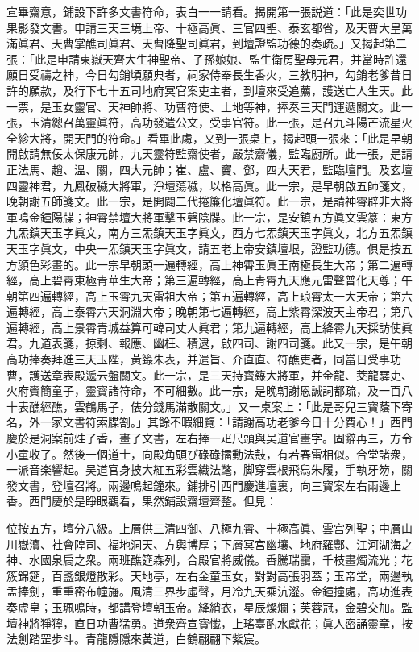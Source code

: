 宣畢齋意，鋪設下許多文書符命，表白一一請看。揭開第一張説道：「此是奕世功果影發文書。申請三天三境上帝、十極高眞、三官四聖、泰玄都省，及天曹大皇萬滿眞君、天曹掌醮司眞君、天曹降聖司眞君，到壇證監功德的奏疏。」又揭起第二張：「此是申請東嶽天齊大生神聖帝、子孫娘娘、監生衛房聖母元君，并當時許還願日受禱之神，今日勾銷頃願典者，祠家侍奉長生香火，三教明神，勾銷老爹昔日許的願款，及行下七十五司地府冥官案吏主者，到壇來受追薦，護送亡人生天。此一票，是玉女靈官、天神帥將、功曹符使、土地等神，捧奏三天門運遞關文。此一張，玉清總召萬靈眞符，高功發遣公文，受事官符。此一張，是召九斗陽芒流星火全紾大將，開天門的符命。」看畢此䖏，又到一張桌上，揭起頭一張來：「此是早朝開啟請無佞太保康元帥，九天靈符監齋使者，嚴禁齋儀，監臨廚所。此一張，是請正法馬、趙、溫、關，四大元帥；崔、盧、竇、鄧，四大天君，監臨壇門。及玄壇四靈神君，九鳳破穢大將軍，淨壇蕩穢，以格高眞。此一宗，是早朝啟五師箋文，晚朝謝五師箋文。此一宗，是開闢二代捲簾化壇眞符。此一宗，是請神霄辟非大將軍鳴金鐘陽牒；神霄禁壇大將軍擊玉磬陰牒。此一宗，是安鎮五方眞文雲篆：東方九炁鎮天玉字眞文，南方三炁鎮天玉字眞文，西方七炁鎮天玉字眞文，北方五炁鎮天玉字眞文，中央一炁鎮天玉字眞文，請五老上帝安鎮壇垠，證監功德。俱是按五方顔色彩畫的。此一宗早朝頭一遍轉經，高上神霄玉眞王南極長生大帝；第二遍轉經，高上碧霄東極青華生大帝；第三遍轉經，高上青霄九天應元雷聲普化天尊；午朝第四遍轉經，高上玉霄九天雷祖大帝；第五遍轉經，高上琅霄太一大天帝；第六遍轉經，高上泰霄六天洞淵大帝；晚朝第七遍轉經，高上紫霄深波天主帝君；第八遍轉經，高上景霄青城益算可韓司丈人眞君；第九遍轉經，高上絳霄九天採訪使眞君。九道表箋，掠剩、報應、幽枉、積逮，啟四司、謝四司箋。此又一宗，是午朝高功捧奏拜進三天玉陛，黃籙朱表，并遣旨、介直直、符醮吏者，同當日受事功曹，護送章表殿遞云盤關文。此一宗，是三天持寳籙大將軍，并金龍、茭龍驛吏、火府賫簡童子，靈寳諸符命，不可細數。此一宗，是晚朝謝恩誠詞都疏，及一百八十表醮經醮，雲鶴馬子，俵分錢馬滿散關文。」又一桌案上：「此是哥兒三寳蔭下寄名，外一家文書符索牒劄。」其餘不暇細覽：「請謝高功老爹今日十分費心！」西門慶於是洞案前炷了香，畫了文書，左右捧一疋尺頭與吴道官畫字。固辭再三，方令小童收了。然後一個道士，向殿角頭ぴ碌碌擂動法鼓，有若春雷相似。合堂諸衆，一派音楽響起。吴道官身披大紅五彩雲織法氅，脚穿雲根飛舄朱履，手執牙笏，關發文書，登壇召將。兩邊鳴起鐘來。鋪排引西門慶進壇裏，向三寳案左右兩邊上香。西門慶於是睜眼觀看，果然鋪設齋壇齊整。但見：

位按五方，壇分八級。上層供三清四御、八極九霄、十極高眞、雲宫列聖；中層山川嶽瀆、社會隍司、福地洞天、方輿博厚；下層冥宫幽壤、地府羅酆、江河湖海之神、水國泉扃之衆。兩班醮筵森列，合殿官將威儀。香騰瑞靄，千枝畫燭流光；花簇錦筵，百盞銀燈散彩。天地亭，左右金童玉女，對對高張羽蓋；玉帝堂，兩邊執盂捧劍，重重密布幢旛。風清三界步虛聲，月冷九天乘沆瀣。金鐘撞處，高功進表奏虚皇；玉珮鳴時，都講登壇朝玉帝。絳綃衣，星辰燦爛；芙蓉冠，金碧交加。監壇神將猙獰，直日功曹猛勇。道衆齊宣寳懺，上瑤臺酌水獻花；眞人密誦靈章，按法劍踏罡步斗。青龍隱隱來黃道，白鶴翩翩下紫宸。


